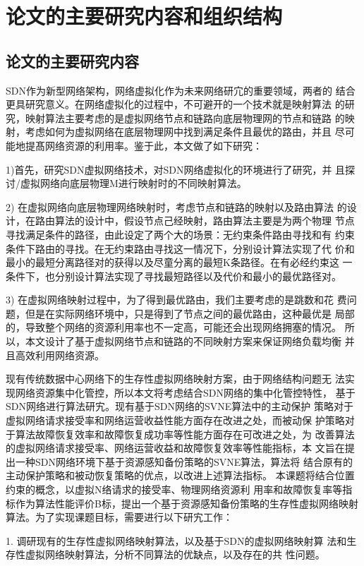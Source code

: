 \section{论文的主要研究内容和组织结构}
\subsection{论文的主要研究内容}
SDN作为新型网络架构，网络虚拟化作为未来网络研宂的重要领域，两者的 结合更具研究意义。在网络虚拟化的过程中，不可避开的一个技术就是映射算法 的研究，映射算法主要考虑的是虚拟网络节点和链路向底层物理网的节点和链路 的映射，考虑如何为虚拟网络在底层物理网中找到满足条件且最优的路由，并且 尽可能地提髙网络资源的利用率。鉴于此，本文做了如下研究：

1)首先，研究SDN虚拟网络技术，对SDN网络虚拟化的环境进行了研究，并 且探讨/虚拟网络向底层物理M进行映射时的不同映射算法。

2)	在虚拟网络向底层物理网络映射时，考虑节点和链路的映射以及路由算法 的设计，在路由算法的设计中，假设节点己经映射，路由算法主要是为两个物理 节点寻找满足条件的路径，由此设定了两个大的场景：无约束条件路由寻找和有 约束条件下路由的寻找。在无约束路由寻找这一情况下，分别设计算法实现了代 价和最小的最短分离路径对的获得以及尽童分离的最短K条路径。在有必经约束这 一条件下，也分别设计算法实现了寻找最短路径以及代价和最小的最优路径对。

3)	在虚拟网络映射过程中，为了得到最优路由，我们主要考虑的是跳数和花 费问题，但是在实际网络环境中，只是得到了节点之间的最优路由，这种最优是 局部的，导致整个网络的资源利用率也不一定高，可能还会出现网络拥塞的情况。 所以，本文设计了基于虚拟网络节点和链路的不同映射方案来保证网络负载均衡 并且高效利用网络资源。

现有传统数据中心网络下的生存性虚拟网络映射方案，由于网络结构问题无 法实现网络资源集中化管控，所以本文将考虑结合SDN网络的集中化管控特性， 基于SDN网络进行算法研宄。现有基于SDN网络的SVNE算法中的主动保护 策略对于虚拟网络请求接受率和网络运营收益性能方面存在改进之处，而被动保 护策略对于算法故障恢复效率和故障恢复成功率等性能方面存在可改进之处，为 改善算法的虚拟网络请求接受率、网络运营收益和故障恢复效率等性能指标，本 文旨在提出一种SDN网络环境下基于资源感知备份策略的SVNE算法，算法将 结合原有的主动保护策略和被动恢复策略的优点，以改进上述算法指标。
本课题将结合位置约束的概念，以虚拟N络请求的接受率、物理网络资源利 用率和故障恢复率等指标作为算法性能评价B标，提出一个基于资源感知备份策略的生存性虚拟网络映射算法。为了实现课题目标，需要进行以下研宄工作：

1.	调研现有的生存性虚拟网络映射算法，以及基于SDN的虚拟网络映射算 法和生存性虚拟网络映射算法，分析不同算法的优缺点，以及存在的共 性问题。

